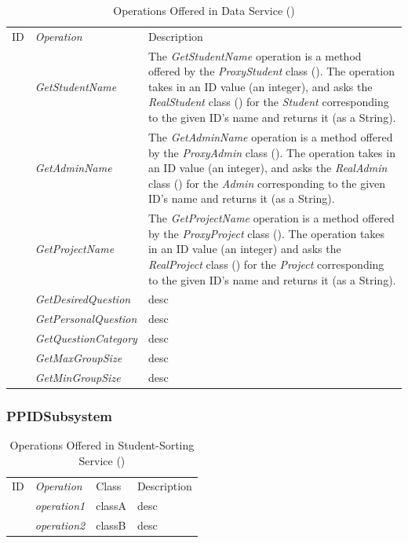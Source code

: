 \documentclass[12pt,letterpaper]{article}
\begin{document}
\begin{table}[H]
\caption{Operations Offered in Data Service ()} 
\begin{tabu} to 
	\tableheader{}ID & Operation & Description\\
	 & GetStudentName & The \textit{GetStudentName} operation is a method offered by the \textit{ProxyStudent} class (). The operation takes in an ID value (an integer), and asks the \textit{RealStudent} class () for the \textit{Student} corresponding to the given ID's name and returns it (as a String).\\
	 & GetAdminName & The \textit{GetAdminName} operation is a method offered by the \textit{ProxyAdmin} class (). The operation takes in an ID value (an integer), and asks the \textit{RealAdmin} class () for the \textit{Admin} corresponding to the given ID's name and returns it (as a String).\\
	 & GetProjectName & The \textit{GetProjectName} operation is a method offered by the \textit{ProxyProject} class (). The operation takes in an ID value (an integer) and asks the \textit{RealProject} class () for the \textit{Project} corresponding to the given ID's name and returns it (as a String).\\
	 & GetDesiredQuestion & desc\\
	 & GetPersonalQuestion & desc\\
	 & GetQuestionCategory & desc\\
	 & GetMaxGroupSize & desc\\
	 & GetMinGroupSize & desc\\
\end{tabu}
\end{table}


\subsubsection*{PPIDSubsystem}

\begin{table}[H]
\caption{Operations Offered in Student-Sorting Service ()} 
\begin{tabu} to 
	\tableheader{}ID & Operation & Class & Description\\
	 & operation1 & classA & desc\\
	 & operation2 & classB & desc\\
\end{tabu}
\end{table}
\end{document}
